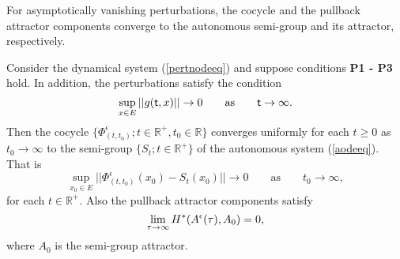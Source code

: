 For asymptotically vanishing perturbations, the cocycle and the pullback
attractor components converge to the autonomous semi-group and its
attractor, respectively.

\begin{cor}
Consider the dynamical system (\ref{pertnodeeq}) and suppose conditions
\textbf{P1 - P3} hold. In addition, the perturbations satisfy the condition
\begin{equation}\label{vaneq}
 \sup_{x \in E} ||g( \mathsf{\mathsf{t}},x)|| \rightarrow 0 \qquad \text{as} \qquad  \mathsf{\mathsf{t}}
                        \rightarrow \infty.
\end{equation}
Then the cocycle $\{\Phi^{\epsilon}_{(t,t_0)} ; t \in \mathbb{R}^+, t_0
\in \mathbb{R} \}$ converges uniformly for each $t \geq 0$ as $t_0
\rightarrow \infty$ to the semi-group $\{S_t ; t \in \mathbb{R}^+ \}$ of
the autonomous system (\ref{aodeeq}). That is
\[ \sup_{x_0 \in E} || \Phi^{\epsilon}_{(t,t_0)}(x_0) - S_t(x_0)||
        \rightarrow 0 \qquad \text{as} \qquad t_0 \rightarrow \infty, \]
for each $t \in \mathbb{R}^+$. Also the pullback attractor components
satisfy
\[ \lim_{\tau \rightarrow \infty} H^* (A^{\epsilon}(\tau),A_0) = 0, \]
where $A_0$ is the semi-group attractor.
\end{cor}
